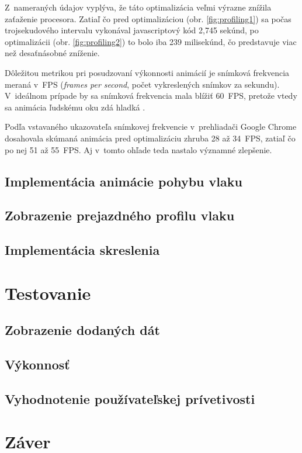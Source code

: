 Z~nameraných údajov vyplýva, že táto optimalizácia veľmi výrazne znížila zaťaženie procesora. Zatiaľ čo pred optimalizáciou (obr. \ref{fig:profiling1}) sa počas trojsekudového intervalu vykonával javascriptový kód 2,745 sekúnd, po optimalizácii (obr. \ref{fig:profiling2}) to bolo iba 239 milisekúnd, čo predstavuje viac než desaťnásobné zníženie.

Dôležitou metrikou pri posudzovaní výkonnosti animácií je snímková frekvencia meraná v~FPS (\emph{frames per second}, počet vykreslených snímkov za sekundu). V~ideálnom prípade by sa snímková frekvencia mala blížiť 60~FPS, pretože vtedy sa animácia ľudskému oku zdá hladká \cite{chrome_profiling}.

Podľa vstavaného ukazovateľa snímkovej frekvencie v~prehliadači Google Chrome dosahovala skúmaná animácia pred optimalizáciu zhruba 28 až 34~FPS, zatiaľ čo po nej 51 až 55~FPS. Aj v~tomto ohľade teda nastalo významné zlepšenie.

\section{Implementácia animácie pohybu vlaku}

\section{Zobrazenie prejazdného profilu vlaku}

\section{Implementácia skreslenia}

\chapter{Testovanie}

\section{Zobrazenie dodaných dát}

\section{Výkonnosť}

\section{Vyhodnotenie používateľskej prívetivosti}

\chapter{Záver}



%

